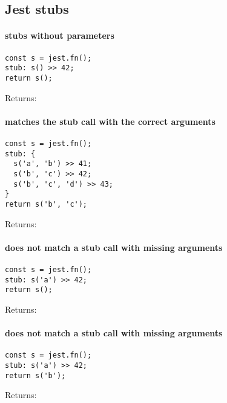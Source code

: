 \subsection*{Jest stubs}

\paragraph*{stubs without parameters}
\begin{verbatim}
const s = jest.fn();
stub: s() >> 42;
return s();
\end{verbatim}
Returns: 
\paragraph*{matches the stub call with the correct arguments}
\begin{verbatim}
const s = jest.fn();
stub: {
  s('a', 'b') >> 41;
  s('b', 'c') >> 42;
  s('b', 'c', 'd') >> 43;
}
return s('b', 'c');
\end{verbatim}
Returns: 
\paragraph*{does not match a stub call with missing arguments}
\begin{verbatim}
const s = jest.fn();
stub: s('a') >> 42;
return s();
\end{verbatim}
Returns: 
\paragraph*{does not match a stub call with missing arguments}
\begin{verbatim}
const s = jest.fn();
stub: s('a') >> 42;
return s('b');
\end{verbatim}
Returns: 
